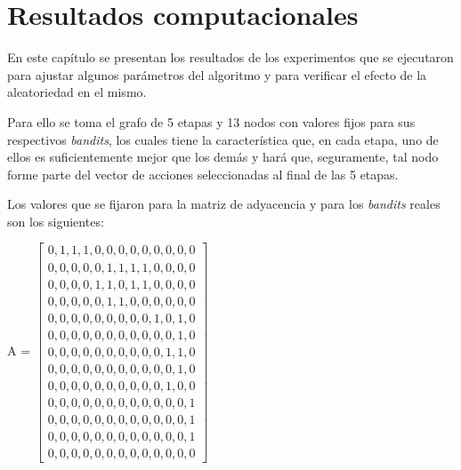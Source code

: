 \chapter{Resultados computacionales}
\label{resul_compu}

En este capítulo se presentan los resultados de los experimentos que se ejecutaron para ajustar algunos parámetros del algoritmo y para verificar el efecto de la aleatoriedad en el mismo.

Para ello se toma el grafo de 5 etapas y 13 nodos con valores fijos para sus respectivos \textit{bandits}, los cuales tiene la característica que, en cada etapa, uno de ellos es suficientemente mejor que los demás y hará que, seguramente, tal nodo forme parte  del vector de acciones seleccionadas al final de las 5 etapas. 

Los valores que se fijaron para la matriz de adyacencia y para los \textit{bandits} reales son los siguientes:

\renewcommand{\arraystretch}{0.5}
A = 
$\begin{bmatrix}

0, 1, 1,  1,  0,  0,  0,  0,  0,  0,  0,  0,  0\\
0, 0, 0,  0,  0,  1,  1,  1,  1,  0,  0,  0,  0\\
0, 0, 0,  0,  1,  1,  0,  1,  1,  0,  0,  0,  0\\
0, 0, 0,  0,  0,  1,  1,  0,  0,  0,  0,  0,  0\\
0, 0, 0,  0,  0,  0,  0,  0,  0,  1,  0,  1,  0\\
0, 0, 0,  0,  0,  0,  0,  0,  0,  0,  0,  1,  0\\
0, 0, 0,  0,  0,  0,  0,  0,  0,  0,  1,  1,  0\\
0, 0, 0,  0,  0,  0,  0,  0,  0,  0,  0,  1,  0\\
0, 0, 0,  0,  0,  0,  0,  0,  0,  0,  1,  0,  0\\
0, 0, 0,  0,  0,  0,  0,  0,  0,  0,  0,  0,  1\\
0, 0, 0,  0,  0,  0,  0,  0,  0,  0,  0,  0,  1\\
0, 0, 0,  0,  0,  0,  0,  0,  0,  0,  0,  0,  1\\
0, 0, 0,  0,  0,  0,  0,  0,  0,  0,  0,  0,  0
\end{bmatrix}$



